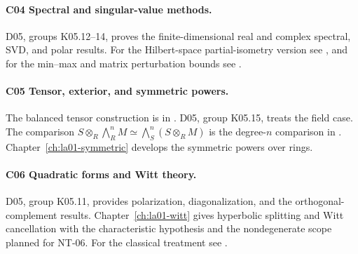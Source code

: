 \paragraph{C04 \enspace Spectral and singular-value methods.}
D05, groups K05.12--14, proves the finite-dimensional real and complex
spectral, SVD, and polar results. For the Hilbert-space partial-isometry
version see \cite{d16}, and for the min--max and matrix perturbation
bounds see \cite{p206}.

\paragraph{C05 \enspace Tensor, exterior, and symmetric powers.}
The balanced tensor construction is in \cite[Ch.~1]{p103}. D05,
group K05.15, treats the field case. The comparison
\(S\otimes_R\bigwedge_R^n M\simeq\bigwedge_S^n(S\otimes_R M)\)
is the degree-\(n\) comparison in \cite[RK-03 and RK-04]{commalg}.
Chapter~\ref{ch:la01-symmetric} develops the symmetric powers over rings.

\paragraph{C06 \enspace Quadratic forms and Witt theory.}
D05, group K05.11, provides polarization, diagonalization, and the
orthogonal-complement results. Chapter~\ref{ch:la01-witt} gives
hyperbolic splitting and Witt cancellation with the characteristic
hypothesis and the nondegenerate scope planned for NT-06.
For the classical treatment see \cite[Ch.~I, Sec.~4]{lam-witt}.
